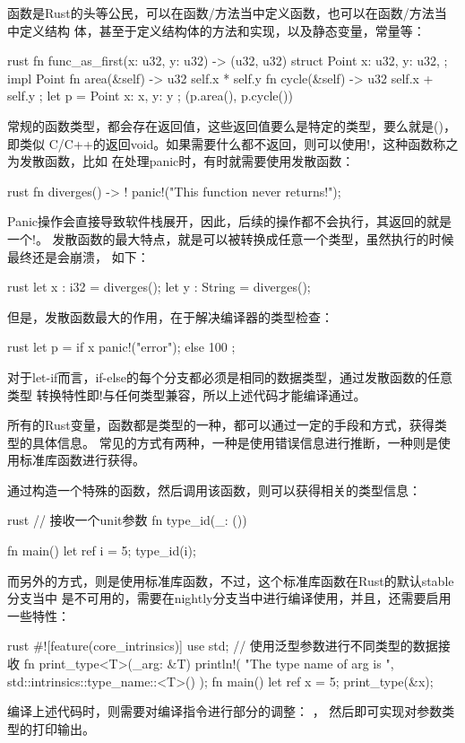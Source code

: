 函数是Rust的头等公民，可以在函数/方法当中定义函数，也可以在函数/方法当中定义结构
体，甚至于定义结构体的方法和实现，以及静态变量，常量等：
\begin{code-block}{rust}
fn func_as_first(x: u32, y: u32) -> (u32, u32) {
    struct Point {
        x: u32,
        y: u32,
    };
    impl Point {
        fn area(&self) -> u32 {
            self.x * self.y
        }
        fn cycle(&self) -> u32 {
            self.x + self.y
        }
    };
    let p = Point { x: x, y: y };
    (p.area(), p.cycle())
}
\end{code-block}

常规的函数类型，都会存在返回值，这些返回值要么是特定的类型，要么就是()，即类似
C/C++的返回void。如果需要什么都不返回，则可以使用!，这种函数称之为发散函数，比如
在处理panic时，有时就需要使用发散函数：
\begin{code-block}{rust}
fn diverges() -> ! {
    panic!("This function never returns!");
}
\end{code-block}
Panic操作会直接导致软件栈展开，因此，后续的操作都不会执行，其返回的就是一个!。
发散函数的最大特点，就是可以被转换成任意一个类型，虽然执行的时候最终还是会崩溃，
如下：
\begin{code-block}{rust}
let x : i32 = diverges();
let y : String = diverges();
\end{code-block}
但是，发散函数最大的作用，在于解决编译器的类型检查：
\begin{code-block}{rust}
let p = if x {
    panic!("error");
} else {
    100
};
\end{code-block}
对于let-if而言，if-else的每个分支都必须是相同的数据类型，通过发散函数的任意类型
转换特性即!与任何类型兼容，所以上述代码才能编译通过。

所有的Rust变量，函数都是类型的一种，都可以通过一定的手段和方式，获得类型的具体信息。
常见的方式有两种，一种是使用错误信息进行推断，一种则是使用标准库函数进行获得。

通过构造一个特殊的函数，然后调用该函数，则可以获得相关的类型信息：
\begin{code-block}{rust}
// 接收一个unit参数
fn type_id(_: ()) {}

fn main() {
    let ref i = 5;
    type_id(i);
}
\end{code-block}

而另外的方式，则是使用标准库函数，不过，这个标准库函数在Rust的默认stable分支当中
是不可用的，需要在nightly分支当中进行编译使用，并且，还需要启用一些特性：
\begin{code-block}{rust}
#![feature(core_intrinsics)]
use std;
// 使用泛型参数进行不同类型的数据接收
fn print_type<T>(_arg: &T) {
    println!(
        "The type name of arg is {}",
        std::intrinsics::type_name::<T>()
    );
}
fn main() {
    let ref x = 5;
    print_type(&x);
}
\end{code-block}
编译上述代码时，则需要对编译指令进行部分的调整：
，
然后即可实现对参数类型的打印输出。

